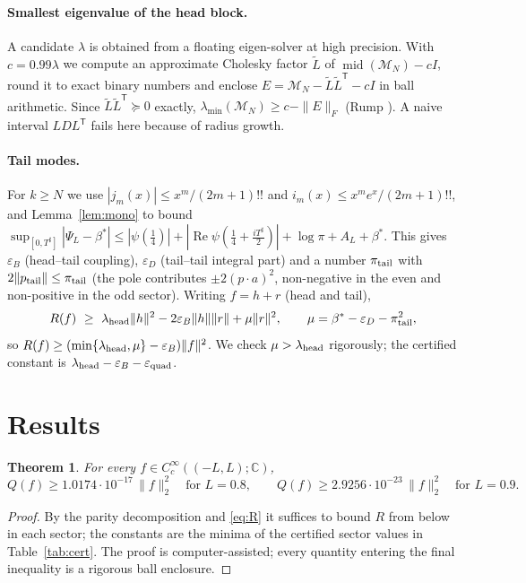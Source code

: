 \documentclass[11pt,a4paper]{article}
\newtheorem{theorem}{Theorem}
\theoremstyle{remark}
\theoremstyle{definition}
\renewcommand{\Re}{\operatorname{Re}}
\newcommand{\eps}{\varepsilon}
\begin{document}
\paragraph{Smallest eigenvalue of the head block.} A candidate $\lambda$ is obtained from a floating eigen-solver at high precision. With $c=0.99\lambda$ we compute an approximate Cholesky factor $\tilde L$ of $\operatorname{mid}(\mathcal M_N)-cI$, round it to exact binary numbers and enclose $E=\mathcal M_N-\tilde L\tilde L^{\mathsf T}-cI$ in ball arithmetic. Since $\tilde L\tilde L^{\mathsf T}\succeq0$ exactly, $\lambda_{\min}(\mathcal M_N)\ge c-\|E\|_F$ (Rump \cite{Rump10}). A naive interval $LDL^{\mathsf T}$ fails here because of radius growth.

\paragraph{Tail modes.} For $k\ge N$ we use $|j_m(x)|\le x^m/(2m+1)!!$ and $i_m(x)\le x^me^x/(2m+1)!!$, and Lemma~\ref{lem:mono} to bound $\sup_{[0,T^\sharp]}|\Psi_L-\beta^*|\le|\psi(\frac14)|+|\Re\psi(\frac14+\frac{iT^\sharp}2)|+\log\pi+A_L+\beta^*$. This gives $\eps_B$ (head--tail coupling), $\eps_D$ (tail--tail integral part) and a number $\pi_{\rm tail}$ with $2\|p_{\rm tail}\|\le\pi_{\rm tail}$ (the pole contributes $\pm2(p\cdot a)^2$, non-negative in the even and non-positive in the odd sector). Writing $f=h+r$ (head and tail),
\[
R(f)\ \ge\ \lambda_{\rm head}\|h\|^2-2\eps_B\|h\|\|r\|+\mu\|r\|^2,\qquad \mu=\beta^*-\eps_D-\pi_{\rm tail}^2 ,
\]
so $R(f)\ge(\min\{\lambda_{\rm head},\mu\}-\eps_B)\|f\|^2$. We check $\mu>\lambda_{\rm head}$ rigorously; the certified constant is $\lambda_{\rm head}-\eps_B-\eps_{\rm quad}$.

\section{Results}

\begin{theorem}\label{thm:main}
For every $f\in C_c^\infty((-L,L);\mathbb C)$,
\[
Q(f)\ge 1.0174\cdot10^{-17}\,\|f\|_2^2\quad\text{for }L=0.8,\qquad
Q(f)\ge 2.9256\cdot10^{-23}\,\|f\|_2^2\quad\text{for }L=0.9 .
\]
\end{theorem}
\begin{proof}
By the parity decomposition and \eqref{eq:R} it suffices to bound $R$ from below in each sector; the constants are the minima of the certified sector values in Table~\ref{tab:cert}. The proof is computer-assisted; every quantity entering the final inequality is a rigorous ball enclosure.
\end{proof}
\end{document}

